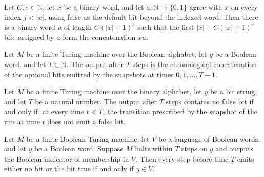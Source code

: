 \begin{lemma}
\label{Complexity.clA5Certificate}
\leanok
{}
Let $C,e\in\mathbb{N}$, let $x$ be a binary word, and let $a:\mathbb{N}\to\{0,1\}$
agree with $x$ on every index $j<|x|$, using false as the default bit beyond the indexed
word. Then there is a binary word $u$ of length $C(|x|+1)^e$ such that the first
$|x|+C(|x|+1)^e$ bits assigned by $a$ form the concatenation $xu$.
\end{lemma}

\begin{lemma}
\label{Complexity.clA5Run_output}
\leanok
{}
Let $M$ be a finite Turing machine over the Boolean alphabet, let $y$ be a Boolean word,
and let $T\in\mathbb{N}$. The output after $T$ steps is the chronological concatenation
of the optional bits emitted by the snapshots at times $0,1,\ldots,T-1$.
\end{lemma}

\begin{lemma}
\label{Complexity.clA5NoFalse}
\leanok
{}
Let $M$ be a finite Turing machine over the binary alphabet, let $y$ be a bit string,
and let $T$ be a natural number. The output after $T$ steps contains no false bit if and
only if, at every time $t<T$, the transition prescribed by the snapshot of the run at
time $t$ does not emit a false bit.
\end{lemma}

\begin{lemma}
\label{Complexity.clA5Decider_accept}
\leanok
{}
Let $M$ be a finite Boolean Turing machine, let $V$ be a language of Boolean words, and
let $y$ be a Boolean word. Suppose $M$ halts within $T$ steps on $y$ and outputs the
Boolean indicator of membership in $V$. Then every step before time $T$ emits either no
bit or the bit true if and only if $y\in V$.
\end{lemma}

